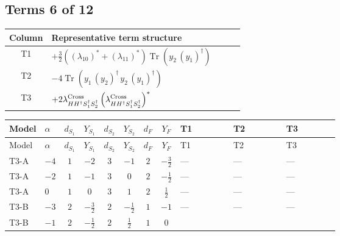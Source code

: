 \documentclass[8pt]{article}
\begin{document}
\begin{landscape}
\subsection*{Terms 6 of 12}
\begin{center}
\begin{tabular}{@{}c >{\raggedright\arraybackslash}p{0.82\linewidth}@{}}
\toprule
Column & Representative term structure \\
\midrule
T1 & \(\displaystyle +\frac{3}{2} (\left({\lambda_{10}}\right)^{*}+\left({\lambda_{11}}\right)^{*}) \operatorname{Tr}\!\left({y_2}\,\left({y_1}\right)^{\dagger}\right)\) \\
\midrule
T2 & \(\displaystyle -4 \operatorname{Tr}\!\left({y_1}\,\left({y_2}\right)^{\dagger}\,{y_2}\,\left({y_1}\right)^{\dagger}\right)\) \\
\midrule
T3 & \(\displaystyle +2 {\lambda_{H H^\dagger S_1^\dagger S_2^\dagger}^{\rm Cross}} \left({\lambda_{H H^\dagger S_1^\dagger S_2^\dagger}^{\rm Cross}}\right)^{*}\) \\
\midrule
\bottomrule
\end{tabular}
\end{center}
\smallskip
\tiny
\begin{longtable}{@{}llcccccc >{\raggedright\arraybackslash}p{0.21\linewidth} >{\raggedright\arraybackslash}p{0.21\linewidth} >{\raggedright\arraybackslash}p{0.21\linewidth}@{}}
\toprule
Model & $\alpha$ & $d_{S_1}$ & $Y_{S_1}$ & $d_{S_2}$ & $Y_{S_2}$ & $d_F$ & $Y_F$ & T1 & T2 & T3 \\
\midrule
\endfirsthead
\toprule
Model & $\alpha$ & $d_{S_1}$ & $Y_{S_1}$ & $d_{S_2}$ & $Y_{S_2}$ & $d_F$ & $Y_F$ & T1 & T2 & T3 \\
\midrule
\endhead
T3-A & $-4$ & $1$ & $-2$ & $3$ & $-1$ & $2$ & $-\frac{3}{2}$ & --- & --- & --- \\
\midrule
T3-A & $-2$ & $1$ & $-1$ & $3$ & $0$ & $2$ & $-\frac{1}{2}$ & --- & --- & --- \\
\midrule
T3-A & $0$ & $1$ & $0$ & $3$ & $1$ & $2$ & $\frac{1}{2}$ & --- & --- & --- \\
\midrule
T3-B & $-3$ & $2$ & $-\frac{3}{2}$ & $2$ & $-\frac{1}{2}$ & $1$ & $-1$ & --- & --- & --- \\
\midrule
T3-B & $-1$ & $2$ & $-\frac{1}{2}$ & $2$ & $\frac{1}{2}$ & $1$ & $0$ & \scriptsize\adjustbox{max width=\linewidth}{$\begin{gathered} +\frac{3}{2} (\left({\lambda_{10}}\right)^{*}+\left({\lambda_{11}}\right)^{*}) \operatorname{Tr}\!\left({y_2}\,\left({y_1}\right)^{\dagger}\right)\end{gathered}$} & \scriptsize\adjustbox{max width=\linewidth}{$\begin{gathered} -4 \operatorname{Tr}\!\left({y_1}\,\left({y_2}\right)^{\dagger}\,{y_2}\,\left({y_1}\right)^{\dagger}\right)\end{gathered}$} & \scriptsize\adjustbox{max width=\linewidth}{$\begin{gathered} +2 {\lambda_{H H^\dagger S_1^\dagger S_2^\dagger}^{\rm Cross}} \left({\lambda_{H H^\dagger S_1^\dagger S_2^\dagger}^{\rm Cross}}\right)^{*}\end{gathered}$} \\

\end{longtable}
\end{landscape}
\end{document}
